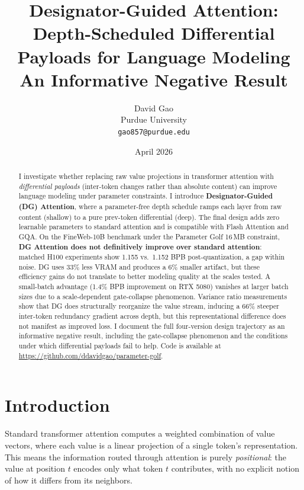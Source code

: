 \documentclass[11pt]{article}
\title{Designator-Guided Attention:\\Depth-Scheduled Differential Payloads for Language Modeling\\{\large An Informative Negative Result}}
\author{David Gao\\Purdue University\\\texttt{gao857@purdue.edu}}
\date{April 2026}
\begin{document}
\maketitle

\begin{abstract}
I investigate whether replacing raw value projections in transformer attention with \emph{differential payloads} (inter-token changes rather than absolute content) can improve language modeling under parameter constraints. I introduce \textbf{Designator-Guided (DG) Attention}, where a parameter-free depth schedule ramps each layer from raw content (shallow) to a pure prev-token differential (deep). The final design adds zero learnable parameters to standard attention and is compatible with Flash Attention and GQA. On the FineWeb-10B benchmark under the Parameter Golf 16\,MB constraint, \textbf{DG Attention does not definitively improve over standard attention}: matched H100 experiments show 1.155 vs.\ 1.152 BPB post-quantization, a gap within noise. DG uses 33\% less VRAM and produces a 6\% smaller artifact, but these efficiency gains do not translate to better modeling quality at the scales tested. A small-batch advantage (1.4\% BPB improvement on RTX 5080) vanishes at larger batch sizes due to a scale-dependent gate-collapse phenomenon. Variance ratio measurements show that DG does structurally reorganize the value stream, inducing a 66\% steeper inter-token redundancy gradient across depth, but this representational difference does not manifest as improved loss. I document the full four-version design trajectory as an informative negative result, including the gate-collapse phenomenon and the conditions under which differential payloads fail to help. Code is available at \url{https://github.com/ddavidgao/parameter-golf}.
\end{abstract}

\section{Introduction}
\label{sec:intro}

Standard transformer attention \citep{vaswani2017attention} computes a weighted combination of value vectors, where each value is a linear projection of a single token's representation. This means the information routed through attention is purely \emph{positional}: the value at position $t$ encodes only what token $t$ contributes, with no explicit notion of how it differs from its neighbors.
\end{document}
